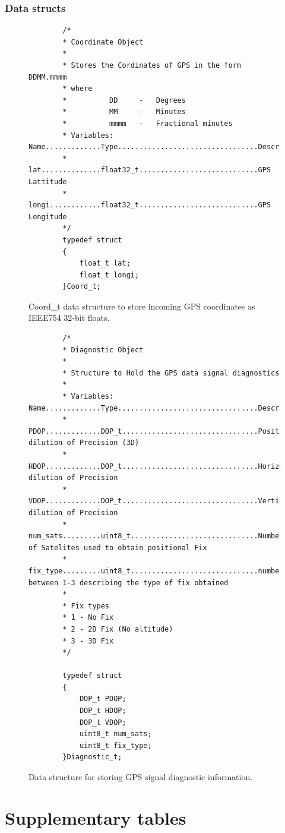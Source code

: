\subsection{Data structs}
\begin{figure}[H]
	\centering
	\begin{lstlisting}
		/*
		* Coordinate Object
		*
		* Stores the Cordinates of GPS in the form DDMM.mmmm
		* where 
		*          DD     -   Degrees
		*          MM     -   Minutes
		*          mmmm   -   Fractional minutes
		* Variables:	Name.............Type.................................Description
		* 				lat..............float32_t............................GPS Lattitude
		* 				longi............float32_t............................GPS Longitude
		*/
		typedef struct
		{
			float_t lat;
			float_t longi;
		}Coord_t;
	\end{lstlisting}    
	\caption{Coord\_t data structure to store incoming GPS coordinates as IEEE754 32-bit floats.}
	\label{fig:data_coord_t}
\end{figure}

\begin{figure}[H]
	\centering
	\begin{lstlisting}
		/*
		* Diagnostic Object
		*
		* Structure to Hold the GPS data signal diagnostics
		*
		* Variables:	Name.............Type.................................Description
		* 				PDOP.............DOP_t................................Positional dilution of Precision (3D)
		* 				HDOP.............DOP_t................................Horizontal dilution of Precision
		* 				VDOP.............DOP_t................................Vertical   dilution of Precision
		* 				num_sats.........uint8_t..............................Number of Satelites used to obtain positional Fix
		* 				fix_type.........uint8_t..............................number between 1-3 describing the type of fix obtained
		*
		* Fix types
		* 1 - No Fix
		* 2 - 2D Fix (No altitude)
		* 3 - 3D Fix
		*/
		
		typedef struct
		{
			DOP_t PDOP;
			DOP_t HDOP;
			DOP_t VDOP;
			uint8_t num_sats;
			uint8_t fix_type;
		}Diagnostic_t;
	\end{lstlisting}
	\caption{Data structure for storing GPS signal diagnostic information.}
	\label{fig:data_Diagnostic_t}
\end{figure}


\chapter{Supplementary tables}

